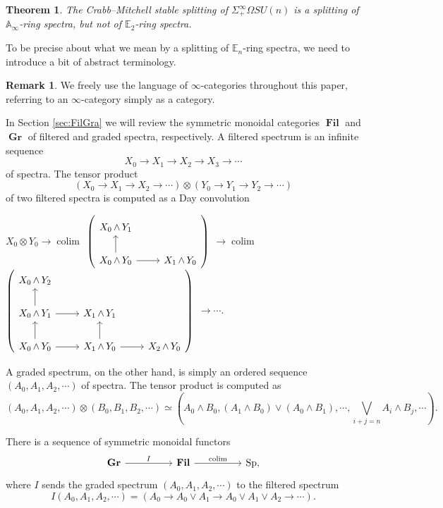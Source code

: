 \documentclass[reqno, oneside]{amsart}
\theoremstyle{definition}
\newtheorem{rmk}[nul]{Remark}
\theoremstyle{plain}
\newtheorem{thm}[nul]{Theorem}
\DeclareMathOperator*{\colim}{\text{colim}}
\DeclareMathOperator{\smsh}{\wedge}
\DeclareMathOperator{\Gr}{\textbf{Gr}}
\DeclareMathOperator{\Fil}{\textbf{Fil}}
\DeclareMathOperator{\Sp}{\text{Sp}}
\begin{document}
\begin{thm}
The Crabb--Mitchell stable splitting of $\Sigma^{\infty}_+ \Omega SU(n)$ is a splitting of $\mathbb{A}_\infty$-ring spectra, but not of $\mathbb{E}_2$-ring spectra.
\end{thm}

To be precise about what we mean by a splitting of $\mathbb{E}_n$-ring spectra, we need to introduce a bit of abstract terminology.

\begin{rmk}
We freely use the language of $\infty$-categories throughout this paper, referring to an $\infty$-category simply as a category.
\end{rmk}

In Section \ref{sec:FilGra} we will review the symmetric monoidal categories $\Fil$ and $\Gr$ of filtered and graded spectra, respectively.  A filtered spectrum is an infinite sequence
$$X_0 \longrightarrow X_1 \longrightarrow X_2 \longrightarrow X_3 \longrightarrow \cdots$$
of spectra.  The tensor product $$\left(X_0 \longrightarrow X_1 \longrightarrow X_2 \longrightarrow \cdots \right) \otimes \left(Y_0 \longrightarrow Y_1 \longrightarrow Y_2 \longrightarrow \cdots \right)$$
of two filtered spectra is computed as a Day convolution

\begin{center}
$X_0 \otimes Y_0 \longrightarrow \colim $
{$ \left(\begin{tikzcd} X_0 \smsh Y_1 \\  X_0 \smsh Y_0 \arrow{u} \arrow{r} & X_1 \smsh Y_0 \end{tikzcd} \right) $} 
$\longrightarrow \colim$
 {$ \left( \begin{tikzcd} X_0 \smsh Y_2 \\ X_0 \smsh Y_1 \arrow{r} \arrow{u} & X_1 \smsh Y_1  \\ X_0 \smsh Y_0 \arrow{r} \arrow{u} & X_1 \smsh Y_0 \arrow{u} \arrow{r} & X_2 \smsh Y_0 \end{tikzcd} \right) $}
$\longrightarrow \cdots.$
\end{center}

A graded spectrum, on the other hand, is simply an ordered sequence $(A_0,A_1,A_2, \cdots)$ of spectra.  The tensor product  is computed as
$$(A_0,A_1,A_2,\cdots) \otimes (B_0,B_1,B_2,\cdots) \simeq \left( A_0 \smsh B_0, (A_1 \smsh B_0) \vee (A_0 \smsh B_1), \cdots, \bigvee_{i+j=n} A_i \smsh B_j, \cdots \right).$$

There is a sequence of symmetric monoidal functors
$$
\begin{tikzcd}[column sep=huge]
\Gr \arrow{r}{I} & \Fil \arrow{r}{\text{colim}} & \Sp,
\end{tikzcd}
$$
where $I$ sends the graded spectrum $(A_0,A_1,A_2,\cdots)$ to the filtered spectrum
$$
I(A_0,A_1,A_2,\cdots) = \left( A_0 \longrightarrow A_0 \vee A_1 \longrightarrow A_0 \vee A_1 \vee A_2 \longrightarrow \cdots\right).
$$
\end{document}
